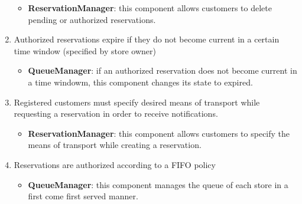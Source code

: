\begin{enumerate}[label=R\arabic*]
\begin{itemize}
		\item \textbf{ReservationManager}: this component allows customers to delete pending or authorized reservations.
	\end{itemize}
	\item Authorized reservations expire if they do not become current in a certain time window (specified by store owner)
	\begin{itemize}
		\item \textbf{QueueManager}: if an authorized reservation does not become current in a time windowm, this component changes its state to expired.
	\end{itemize}
	\item Registered customers must specify desired means of transport while requesting a reservation in order to receive notifications. %
	\begin{itemize}
		\item \textbf{ReservationManager}: this component allows customers to specify the means of transport while creating a reservation.
	\end{itemize}
	\item Reservations are authorized according to a FIFO policy
	\begin{itemize}
		\item \textbf{QueueManager}: this component manages the queue of each store in a first come first served manner.
	\end{itemize}
\end{enumerate}